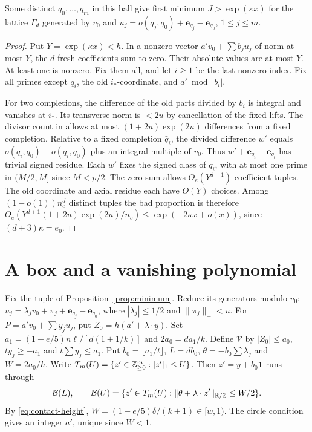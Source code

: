 \begin{proposition}\label{prop:minimum}
Some distinct $q_0,\ldots,q_m$ in this ball give first minimum
$J>\exp(\kappa x)$ for the lattice $\Gamma_d$ generated by $v_0$ and
$u_j=o(q_j,q_0)+\mathbf e_{q_j}-\mathbf e_{q_0}$, $1\le j\le m$.
\end{proposition}
\begin{proof}
Put $Y=\exp(\kappa x)<h$. In a nonzero vector $a'v_0+\sum b_j u_j$
of norm at most $Y$, the $d$ fresh coefficients sum to zero.
Their absolute values are at most $Y$. At least one is nonzero.
Fix them all, and let $i\ge1$ be the last nonzero index.
Fix all primes except $q_i$, the old $i_*$-coordinate, and $a'\bmod |b_i|$.

For two completions, the difference of the old parts divided by $b_i$
is integral and vanishes at $i_*$. Its transverse norm is $<2u$
by cancellation of the fixed lifts. The divisor count in
\cite[proof of Lemma~6.2, small-denominator count]{Z29}
allows at most $(1+2u)\exp(2u)$ differences from a fixed completion.
Relative to a fixed completion $\bar q_i$, the divided difference $w'$ equals
$o(q_i,q_0)-o(\bar q_i,q_0)$ plus an integral multiple of $v_0$.
Thus $w'+\mathbf e_{q_i}-\mathbf e_{\bar q_i}$ has trivial signed residue.
Each $w'$ fixes the signed class of $q_i$, with at most one prime in $(M/2,M]$ since $M<p/2$.
The zero sum allows $O_e(Y^{d-1})$ coefficient tuples.
The old coordinate and axial residue each have $O(Y)$ choices.
Among $(1-o(1))n_c^d$ distinct tuples the bad proportion is therefore
$O_e(Y^{d+1}(1+2u)\exp(2u)/n_c)\le\exp(-2\kappa x+o(x))$,
since $(d+3)\kappa=e_0$.
\end{proof}

\section{A box and a vanishing polynomial}\label{sec:box}

Fix the tuple of Proposition~\ref{prop:minimum}. Reduce its generators modulo $v_0$:
$u_j=\lambda_jv_0+\pi_j+\mathbf e_{q_j}-\mathbf e_{q_0}$,
where $|\lambda_j|\le1/2$ and $\|\pi_j\|_\perp<u$.
For $P=a'v_0+\sum y_j u_j$, put $Z_0=h(a'+\lambda\cdot y)$.
Set $a_1=(1-e/5)n\ell/[d(1+1/k)]$ and $2a_0=da_1/k$.
Define $\mathcal V$ by $|Z_0|\le a_0$, $ty_j\ge-a_1$ and $t\sum y_j\le a_1$.
Put $b_0=\lfloor a_1/t\rfloor$, $L=db_0$, $\theta=-b_0\sum\lambda_j$ and $W=2a_0/h$.
Write $T_m(U)=\{z'\in\mathbb Z_{\ge0}^m:|z'|_1\le U\}$.
Then $z'=y+b_0\mathbf1$ runs through
\[
 \mathcal B(L),\qquad
 \mathcal B(U)=\{z'\in T_m(U):\|\theta+\lambda\cdot z'\|_{\mathbb R/\mathbb Z}\le W/2\}.
\]
By \eqref{eq:contact-height}, $W=(1-e/5)\delta/(k+1)\in[w,1)$.
The circle condition gives an integer $a'$, unique since $W<1$.

